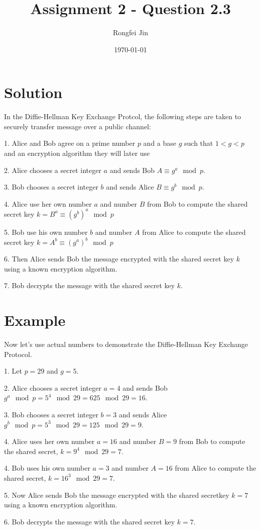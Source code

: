 \documentclass{article}
\author{Rongfei Jin}
\title{Assignment 2 - Question 2.3}
\date{\today}
\begin{document}
\section{Solution}
In the Diffie-Hellman Key Exchange Protcol, the following steps are taken to securely transfer message over a public channel:

1. Alice and Bob agree on a prime number $p$ and a base $g$ such that $1 < g < p$ and an encryption algorithm they will later use

2. Alice chooses a secret integer $a$ and sends Bob $A\equiv g^a \mod p$.

3. Bob chooses a secret integer $b$ and sends Alice $B\equiv g^b \mod p$. 

4. Alice use her own number $a$ and number $B$ from Bob to compute the shared secret key $k = B^a \equiv (g^b)^a \mod p$

5. Bob use his own number $b$ and number $A$ from Alice to compute the shared secret key $k = A^b \equiv (g^a)^b \mod p$

6. Then Alice sends Bob the message encrypted with the shared secret key $k$ using a known encryption algorithm.

7. Bob decrypts the message with the shared secret key $k$.

\section{Example}
Now let's use actual numbers to demonstrate the Diffie-Hellman Key Exchange Protocol. 

1. Let $p = 29$ and $g = 5$.

2. Alice chooses a secret integer $a = 4$ and sends Bob $g^a \mod p = 5^4 \mod 29 = 625 \mod 29 = 16$.

3. Bob chooses a secret integer $b = 3$ and sends Alice $g^b \mod p = 5^3 \mod 29 = 125 \mod 29 = 9$.

4. Alice uses her own number $a = 16$ and number $B = 9$ from Bob to compute the shared secret, $k = 9^{4} \mod 29 = 7$.

4. Bob uses his own number $a = 3$ and number $A = 16$ from Alice to compute the shared secret, $k = 16^{3} \mod 29 = 7$.

5. Now Alice sends Bob the message encrypted with the shared secretkey $k = 7$ using a known encryption algorithm.

6. Bob decrypts the message with the shared secret key $k = 7$.
\end{document}
